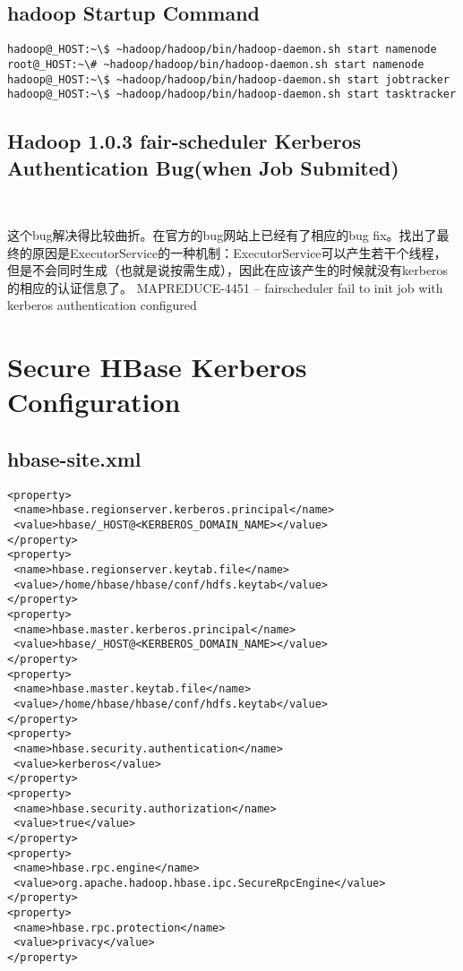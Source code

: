\documentclass[a4paper,12pt]{article}
\begin{document}
\begin{CJK}{UTF8}{gbsn}
\subsection{hadoop Startup Command}

\begin{verbatim}
hadoop@_HOST:~\$ ~hadoop/hadoop/bin/hadoop-daemon.sh start namenode
root@_HOST:~\# ~hadoop/hadoop/bin/hadoop-daemon.sh start namenode
hadoop@_HOST:~\$ ~hadoop/hadoop/bin/hadoop-daemon.sh start jobtracker
hadoop@_HOST:~\$ ~hadoop/hadoop/bin/hadoop-daemon.sh start tasktracker
\end{verbatim}

\subsection{Hadoop 1.0.3 fair-scheduler Kerberos Authentication Bug(when Job Submited)}　

这个bug解决得比较曲折。在官方的bug网站上已经有了相应的bug fix。找出了最终的原因是ExecutorService的一种机制：ExecutorService可以产生若干个线程，但是不会同时生成（也就是说按需生成），因此在应该产生的时候就没有kerberos的相应的认证信息了。
MAPREDUCE-4451 -- fairscheduler fail to init job with kerberos authentication configured
\section{Secure HBase Kerberos Configuration}

\subsection{hbase-site.xml}
\begin{verbatim}
<property>
 <name>hbase.regionserver.kerberos.principal</name>
 <value>hbase/_HOST@<KERBEROS_DOMAIN_NAME></value>
</property>
<property>
 <name>hbase.regionserver.keytab.file</name>
 <value>/home/hbase/hbase/conf/hdfs.keytab</value>
</property>
<property>
 <name>hbase.master.kerberos.principal</name>
 <value>hbase/_HOST@<KERBEROS_DOMAIN_NAME></value>
</property>
<property>
 <name>hbase.master.keytab.file</name>
 <value>/home/hbase/hbase/conf/hdfs.keytab</value>
</property>
<property>
 <name>hbase.security.authentication</name>
 <value>kerberos</value>
</property>
<property>
 <name>hbase.security.authorization</name>
 <value>true</value>
</property>
<property>
 <name>hbase.rpc.engine</name>
 <value>org.apache.hadoop.hbase.ipc.SecureRpcEngine</value>
</property>
<property>
 <name>hbase.rpc.protection</name>
 <value>privacy</value>
</property>
\end{verbatim}


\end{CJK}
\end{document}
